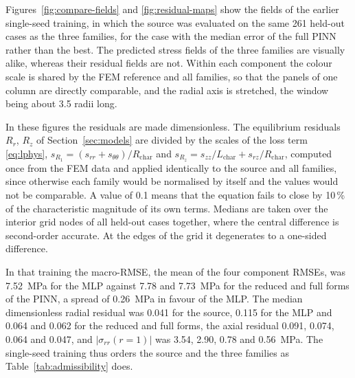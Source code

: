 \documentclass[subscriptcorrection,upint,varvw,barcolor=Goldenrod3,mathalfa=cal=euler,balance,hyphenate,french,pdf-a]{asmejour} %
\begin{document}
Figures~\ref{fig:compare-fields} and \ref{fig:residual-maps} show the fields of the earlier single-seed training, in which the source was evaluated on the same 261 held-out cases as the three families, for the case with the median error of the full PINN rather than the best. The predicted stress fields of the three families are visually alike, whereas their residual fields are not. Within each component the colour scale is shared by the FEM reference and all families, so that the panels of one column are directly comparable, and the radial axis is stretched, the window being about 3.5 radii long.

In these figures the residuals are made dimensionless. The equilibrium residuals $R_r$, $R_z$ of Section~\ref{sec:models} are divided by the scales of the loss term \eqref{eq:lphys}, $s_{R_1}=(s_{rr}+s_{\theta\theta})/R_{\mathrm{char}}$ and $s_{R_z}=s_{zz}/L_{\mathrm{char}}+s_{rz}/R_{\mathrm{char}}$, computed once from the FEM data and applied identically to the source and all families, since otherwise each family would be normalised by itself and the values would not be comparable. A value of 0.1 means that the equation fails to close by 10\,\% of the characteristic magnitude of its own terms. Medians are taken over the interior grid nodes of all held-out cases together, where the central difference is second-order accurate. At the edges of the grid it degenerates to a one-sided difference.

In that training the macro-RMSE, the mean of the four component RMSEs, was 7.52~MPa for the MLP against 7.78 and 7.73~MPa for the reduced and full forms of the PINN, a spread of 0.26~MPa in favour of the MLP. The median dimensionless radial residual was 0.041 for the source, 0.115 for the MLP and 0.064 and 0.062 for the reduced and full forms, the axial residual 0.091, 0.074, 0.064 and 0.047, and $|\sigma_{rr}(r{=}1)|$ was 3.54, 2.90, 0.78 and 0.56~MPa. The single-seed training thus orders the source and the three families as Table~\ref{tab:admissibility} does. %
\end{document}
